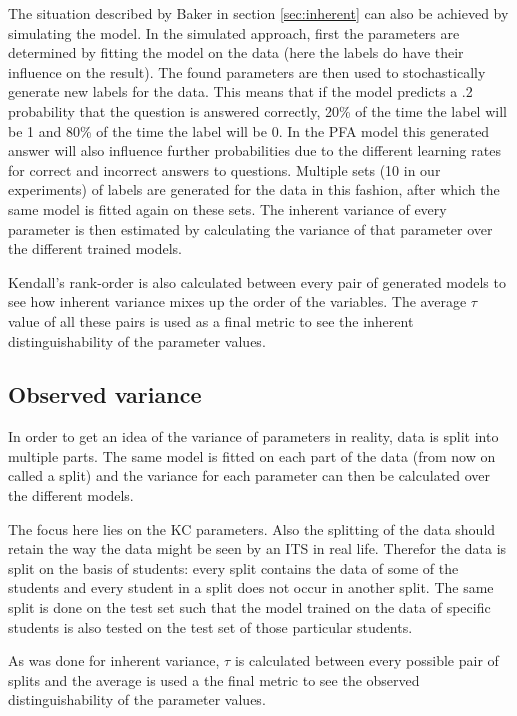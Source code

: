\documentclass{scrartcl}
\begin{document}
The situation described by Baker in section \ref{sec:inherent} can also be achieved by simulating the model. In the simulated approach, first the parameters are determined by fitting the model on the data (here the labels do have their influence on the result). The found parameters are then used to stochastically generate new labels for the data. This means that if the model predicts a .2 probability that the question is answered correctly, 20\% of the time the label will be 1 and 80\% of the time the label will be 0. In the PFA model this generated answer will also influence further probabilities due to the different learning rates for correct and incorrect answers to questions. Multiple sets (10 in our experiments) of labels are generated for the data in this fashion, after which the same model is fitted again on these sets. The inherent variance of every parameter is then estimated by calculating the variance of that parameter over the different trained models.

Kendall's rank-order is also calculated between every pair of generated models to see how inherent variance mixes up the order of the variables. The average $\tau$ value of all these pairs is used as a final metric to see the inherent distinguishability of the parameter values.

\subsection{Observed variance}
\label{sec:splits}
In order to get an idea of the variance of parameters in reality, data is split into multiple parts. The same model is fitted on each part of the data (from now on called a split) and the variance for each parameter can then be calculated over the different models. 

The focus here lies on the KC parameters. Also the splitting of the data should retain the way the data might be seen by an ITS in real life. Therefor the data is split on the basis of students: every split contains the data of some of the students and every student in a split does not occur in another split. The same split is done on the test set such that the model trained on the data of specific students is also tested on the test set of those particular students.


As was done for inherent variance, $\tau$ is calculated between every possible pair of splits and the average is used a the final metric to see the observed distinguishability of the parameter values.
\end{document}

